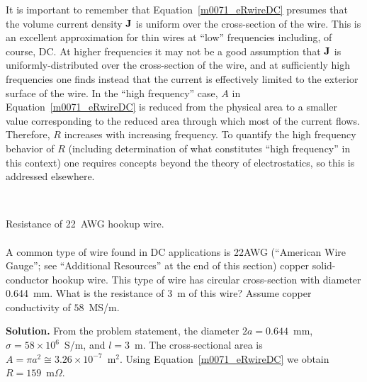 It is important to remember that Equation~\ref{m0071_eRwireDC} presumes that the volume current density ${\bf J}$ is uniform over the cross-section of the wire.  
This is an excellent approximation for thin wires at ``low'' frequencies including, of course, DC.
At higher frequencies it may not be a good assumption that ${\bf J}$ is uniformly-distributed over the cross-section of the wire, and at sufficiently high frequencies one finds instead that the current is effectively limited to the exterior surface of the wire.  
In the ``high frequency'' case, $A$ in Equation~\ref{m0071_eRwireDC} is reduced from the physical area to a smaller value corresponding to the reduced area through which most of the current flows.
Therefore, $R$ increases with increasing frequency.  
To quantify the high frequency behavior of $R$ (including determination of what constitutes ``high frequency'' in this context) one requires concepts beyond the theory of electrostatics, so this is addressed elsewhere.


~\\ \begin{example} 
\begin{mdframed}[backgroundcolor=brown!20,linecolor=brown!20]\raggedright
Resistance of 22~AWG hookup wire.
\\~\\
A common type of wire found in DC applications is 22AWG (``American Wire Gauge''; see ``Additional Resources'' at the end of this section) copper solid-conductor hookup wire.
This type of wire has circular cross-section with diameter 0.644~mm.
What is the resistance of 3~m of this wire? 
Assume copper conductivity of $58$~MS/m.

{\bf Solution.} 
From the problem statement,
the diameter $2a=0.644$~mm,
$\sigma=58\times 10^6$~S/m, and 
$l=3$~m.
The cross-sectional area is $A=\pi a^2 \cong 3.26\times10^{-7}$~m$^2$.
Using Equation~\ref{m0071_eRwireDC} we obtain $R=159$~m$\Omega$.
\end{mdframed}\end{example}




